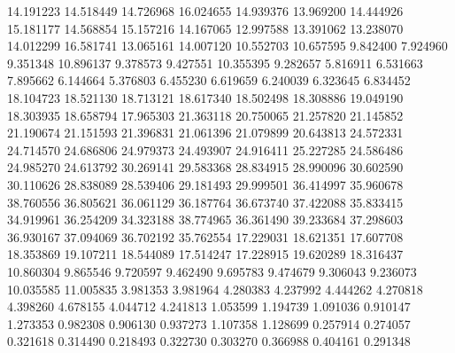 14.191223
14.518449
14.726968
16.024655
14.939376
13.969200
14.444926
15.181177
14.568854
15.157216
14.167065
12.997588
13.391062
13.238070
14.012299
16.581741
13.065161
14.007120
10.552703
10.657595
9.842400
7.924960
9.351348
10.896137
9.378573
9.427551
10.355395
9.282657
5.816911
6.531663
7.895662
6.144664
5.376803
6.455230
6.619659
6.240039
6.323645
6.834452
18.104723
18.521130
18.713121
18.617340
18.502498
18.308886
19.049190
18.303935
18.658794
17.965303
21.363118
20.750065
21.257820
21.145852
21.190674
21.151593
21.396831
21.061396
21.079899
20.643813
24.572331
24.714570
24.686806
24.979373
24.493907
24.916411
25.227285
24.586486
24.985270
24.613792
30.269141
29.583368
28.834915
28.990096
30.602590
30.110626
28.838089
28.539406
29.181493
29.999501
36.414997
35.960678
38.760556
36.805621
36.061129
36.187764
36.673740
37.422088
35.833415
34.919961
36.254209
34.323188
38.774965
36.361490
39.233684
37.298603
36.930167
37.094069
36.702192
35.762554
17.229031
18.621351
17.607708
18.353869
19.107211
18.544089
17.514247
17.228915
19.620289
18.316437
10.860304
9.865546
9.720597
9.462490
9.695783
9.474679
9.306043
9.236073
10.035585
11.005835
3.981353
3.981964
4.280383
4.237992
4.444262
4.270818
4.398260
4.678155
4.044712
4.241813
1.053599
1.194739
1.091036
0.910147
1.273353
0.982308
0.906130
0.937273
1.107358
1.128699
0.257914
0.274057
0.321618
0.314490
0.218493
0.322730
0.303270
0.366988
0.404161
0.291348
